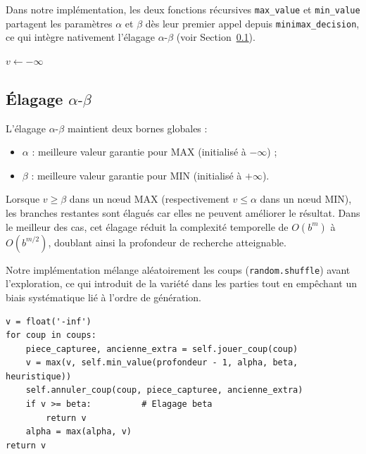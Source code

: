 \documentclass[12pt, a4paper]{article}
\begin{document}
Dans notre implémentation, les deux fonctions récursives \texttt{max\_value} et
\texttt{min\_value} partagent les paramètres $\alpha$ et $\beta$ dès leur premier appel depuis
\texttt{minimax\_decision}, ce qui intègre nativement l'élagage $\alpha\text{-}\beta$ (voir
Section~\ref{sec:alphabeta}).

\begin{algorithm}[H]
\DontPrintSemicolon
\SetAlgoLined
\caption{Minimax (version MAX)}
$v \leftarrow -\infty$\;
\end{algorithm}

\subsection{Élagage $\alpha\text{-}\beta$}
\label{sec:alphabeta}

L'élagage $\alpha\text{-}\beta$ maintient deux bornes globales :
\begin{itemize}[leftmargin=*]
  \item $\alpha$ : meilleure valeur garantie pour MAX (initialisé à $-\infty$) ;
  \item $\beta$ : meilleure valeur garantie pour MIN (initialisé à $+\infty$).
\end{itemize}



Lorsque $v \geq \beta$ dans un nœud MAX (respectivement $v \leq \alpha$ dans un nœud MIN),
les branches restantes sont élagués car elles ne peuvent améliorer le résultat. Dans le
meilleur des cas, cet élagage réduit la complexité temporelle de $O(b^m)$ à $O(b^{m/2})$,
doublant ainsi la profondeur de recherche atteignable.

Notre implémentation mélange aléatoirement les coups (\texttt{random.shuffle}) avant
l'exploration, ce qui introduit de la variété dans les parties tout en empêchant un biais
systématique lié à l'ordre de génération.

\begin{lstlisting}[caption={Élagage $\alpha\text{-}\beta$ dans \texttt{max\_value}.}]
v = float('-inf')
for coup in coups:
    piece_capturee, ancienne_extra = self.jouer_coup(coup)
    v = max(v, self.min_value(profondeur - 1, alpha, beta, heuristique))
    self.annuler_coup(coup, piece_capturee, ancienne_extra)
    if v >= beta:          # Elagage beta
        return v
    alpha = max(alpha, v)
return v
\end{lstlisting}
\end{document}
